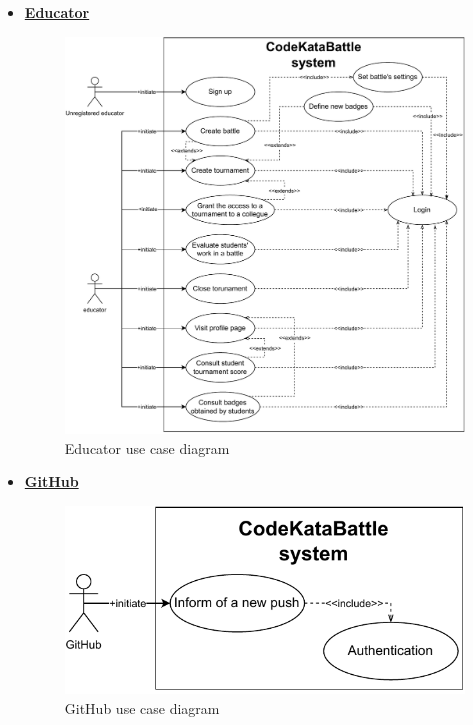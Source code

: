 \documentclass{article}
\begin{document}
{\begin{itemize}
                    N.B: The repository citated in this diagram, on which the student upload their solution, it's not
                    part of the platform. The system, in fact, relies on a third party service (GitHub) to handle the repository.
                    This use case was specified in order to better clarify the tight interaction between the system and the student trought the GitHub service.
                \item \underline{\large{\textbf{Educator}}}
                    \begin{figure}[H]
                        \centering
                        \includegraphics[scale=0.55]{images/3.2.2_UseCaseDiagrams/CaseDiagramEducator.pdf}
                        \caption{Educator use case diagram}
                        \label{fig:educatorUseCaseDiagram}
                    \end{figure}
                \item \underline{\large{\textbf{GitHub}}}
                    \begin{figure}[H]
                        \centering
                        \includegraphics[scale=0.55]{images/3.2.2_UseCaseDiagrams/CaseDiagramGitHub.pdf}
                        \caption{GitHub use case diagram}
                        \label{fig:gitHubUseCaseDiagram}
                    \end{figure}
                

\end{itemize}}
\end{document}

